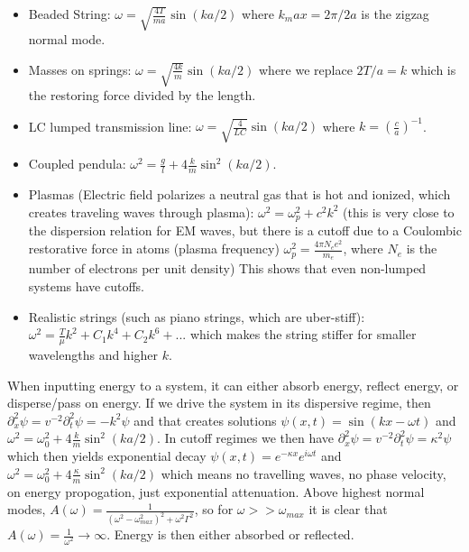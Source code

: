\documentclass{report}
\begin{document}
\begin{itemize}
\item Beaded String: $\omega = \sqrt{\frac{4T}{ma}}\sin(ka/2)$ where $k_max = 2\pi/2a$ is the zigzag normal mode.
\item Masses on springs: $\omega = \sqrt{\frac{4k}{m}}\sin(ka/2)$ where we replace $2T/a = k$ which is the restoring force divided by the length.
\item LC lumped transmission line: $\omega = \sqrt{\frac{4}{LC}}\sin(ka/2)$ where $k = (\frac{c}{a})^{-1}$. 
\item Coupled pendula: $\omega^2 = \frac{g}{l} + 4\frac{k}{m}\sin^2(ka/2)$.
\item Plasmas (Electric field polarizes a neutral gas that is hot and ionized, which creates traveling waves through plasma): $\omega^2 = \omega_p^2 + c^2k^2$ (this is very close to the dispersion relation for EM waves, but there is a cutoff due to a Coulombic restorative force in atoms (plasma frequency) $\omega_p^2 = \frac{4\pi N_ee^2}{m_e}$, where $N_e$ is the number of electrons per unit density) This shows that even non-lumped systems have cutoffs.
\item Realistic strings (such as piano strings, which are uber-stiff): $\omega^2 = \frac{T}{\mu}k^2 + C_1k^4 + C_2k^6 +...$ which makes the string stiffer for smaller wavelengths and higher $k$. 
\end{itemize}

When inputting energy to a system, it can either absorb energy, reflect energy, or disperse/pass on energy. If we drive the system in its dispersive regime, then $\partial_x^2\psi = v^{-2}\partial_t^2 \psi = -k^2\psi$ and that creates solutions $\psi(x,t) = \sin(kx - \omega t)$ and $\omega^2 = \omega_0^2 + 4\frac{k}{m}\sin^2(ka/2)$. In cutoff regimes we then have $\partial_x^2\psi = v^{-2}\partial_t^2\psi = \kappa^2\psi$ which then yields exponential decay $\psi(x,t) = e^{-\kappa x}e^{i\omega t}$ and $\omega^2 = \omega_0^2 + 4\frac{\kappa}{m}\sin^2(ka/2)$ which means no travelling waves, no phase velocity, on energy propogation, just exponential attenuation. Above highest normal modes, $A(\omega) = \frac{1}{(\omega^2 - \omega_{max}^2)^2 + \omega^2\Gamma^2}$, so for $\omega >> \omega_{max}$ it is clear that $A(\omega) = \frac{1}{\omega^2} \to \infty$. Energy is then either absorbed or reflected.
\end{document}

